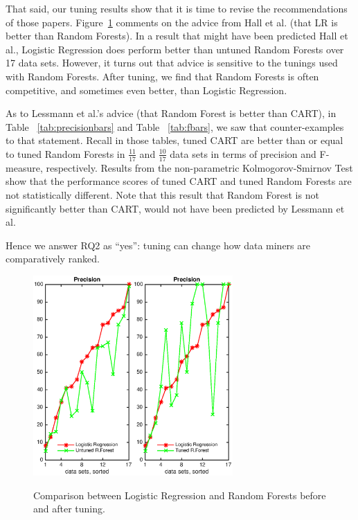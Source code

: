 \documentclass{sig-alternative}
\newcommand{\fig}[1]{Figure~\ref{fig:#1}}
\newcommand{\tab}[1]{Table ~\ref{tab:#1}}
\begin{document}
That said, our tuning results show that it is time to revise
the recommendations of those papers. 
  \fig{lr} comments on the advice from Hall et al. (that LR is better than Random Forests).
 In a result that might have been predicted Hall et al., Logistic Regression does perform better than untuned Random
Forests over 17 data sets. 
However, it turns out that advice is sensitive to the tunings
used with Random Forests. After tuning, we find that Random Forests
is often competitive, and sometimes even better, than Logistic Regression. 


As to Lessmann et al.'s advice (that Random Forest is better than 
CART),  
in \tab{precisionbars} and \tab{fbars}, we saw that counter-examples
to that statement.
Recall in those tables,
tuned CART are better than or equal
to tuned Random Forests in $\frac{11}{17}$ and $\frac{10}{17}$ data sets in
terms of precision and F-measure, respectively. Results from the non-parametric
Kolmogorov-Smirnov Test show that the performance 
scores of tuned CART and tuned Random Forests are not statistically different.
Note that this  result that Random Forest is  not significantly better than   CART, would not have been
predicted by   Lessmann et al.
  

Hence we answer RQ2 as ``yes'': tuning can change how  data miners are comparatively ranked.
 

\begin{figure}[!t]
\begin{center}
\includegraphics[width=1.5in]{LR_untuned.eps}\includegraphics[width=1.5in]{LR_tuned.eps}
 \end{center}
\caption{Comparison between Logistic Regression and Random Forests before and after tuning. }\label{fig:lr}
 \end{figure}
\end{document}
